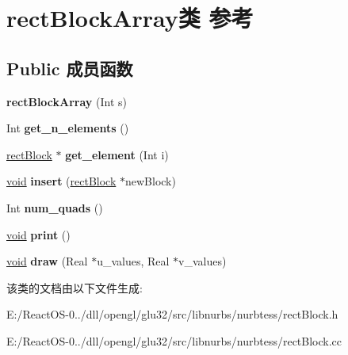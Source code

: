 \hypertarget{classrect_block_array}{}\section{rect\+Block\+Array类 参考}
\label{classrect_block_array}
\subsection*{Public 成员函数}
\begin{DoxyCompactItemize}
\item 
\mbox{\label{classrect_block_array_ae1af052a7cd4e9de247391339e3e0e57}} 
{\bfseries rect\+Block\+Array} (Int s)
\item 
\mbox{\label{classrect_block_array_acccc7ca7c83c5fd8e833b0c7ef2674e3}} 
Int {\bfseries get\+\_\+n\+\_\+elements} ()
\item 
\mbox{\label{classrect_block_array_a8aefce6c2768d8fa84df8063511c1436}} 
\hyperlink{classrect_block}{rect\+Block} $\ast$ {\bfseries get\+\_\+element} (Int i)
\item 
\mbox{\label{classrect_block_array_a1123398de966939707d28e9b24f99dbf}} 
\hyperlink{interfacevoid}{void} {\bfseries insert} (\hyperlink{classrect_block}{rect\+Block} $\ast$new\+Block)
\item 
\mbox{\label{classrect_block_array_a87343a0ab73e8551fadd39179b7b02dc}} 
Int {\bfseries num\+\_\+quads} ()
\item 
\mbox{\label{classrect_block_array_a0c110d4fde5fb4f87fd3fcfc6a5b84cb}} 
\hyperlink{interfacevoid}{void} {\bfseries print} ()
\item 
\mbox{\label{classrect_block_array_a74b546d52715f668c6810c98861b1c06}} 
\hyperlink{interfacevoid}{void} {\bfseries draw} (Real $\ast$u\+\_\+values, Real $\ast$v\+\_\+values)
\end{DoxyCompactItemize}


该类的文档由以下文件生成\+:\begin{DoxyCompactItemize}
\item 
E\+:/\+React\+O\+S-\/0../dll/opengl/glu32/src/libnurbs/nurbtess/rect\+Block.\+h\item 
E\+:/\+React\+O\+S-\/0../dll/opengl/glu32/src/libnurbs/nurbtess/rect\+Block.\+cc\end{DoxyCompactItemize}
